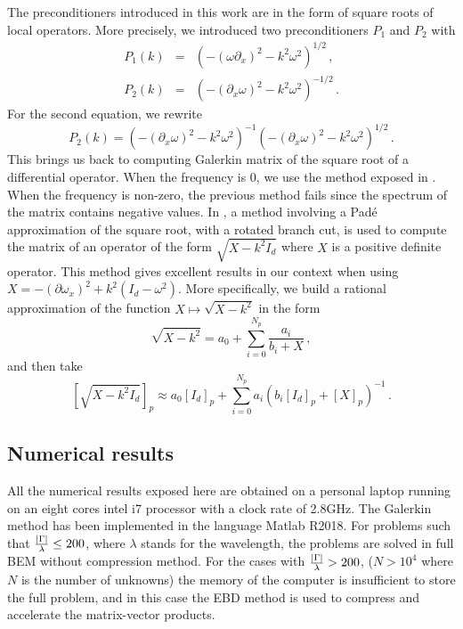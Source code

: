 \documentclass[a4paper]{article}
\begin{document}
The preconditioners introduced in this work are in the form of square roots of local operators. More precisely, we introduced two preconditioners $P_1$ and $P_2$ with 
\begin{eqnarray*}
	P_1(k) &=& \left(-(\omega \partial_x)^2 - k^2 \omega^2\right)^{1/2}\,,\\
	P_2(k) &=& \left(-(\partial_x \omega)^2 - k^2 \omega^2 \right)^{-1/2}\,.
\end{eqnarray*}
For the second equation, we rewrite 
\[P_2(k) = \left(-(\partial_x \omega)^2 - k^2 \omega^2 \right)^{-1} \left(-(\partial_x \omega)^2 - k^2 \omega^2 \right)^{1/2}\,.\]
This brings us back to computing Galerkin matrix of the square root of a differential operator. When the frequency is $0$, we use the method exposed in \cite{hale2008computing}. 
When the frequency is non-zero, the previous method fails since the spectrum of the matrix contains negative values. In \cite{antoine2007generalized}, a 
method involving a Pad\'e approximation of the square root, with a rotated branch cut, is used to compute the matrix of an operator of the form 
$\sqrt{X - k^2 I_d}$ where $X$ is a positive definite operator. This method gives excellent results in our context when using 
$X = -(\partial \omega_x)^2 + k^2 \left(I_d - \omega^2\right)$. More specifically, we build a rational approximation of the function $X \mapsto \sqrt{X - k^2}$ in the form
\[\sqrt{X - k^2} = a_0 + \sum_{i = 0}^{N_p} \frac{a_i}{b_i + X}\,,\]
and then take
\[\left[\sqrt{X - k^2 I_d}\right]_p \approx a_0[I_d]_p + \sum_{i = 0}^{N_p} a_i\left(b_i[I_d]_p + [X]_p\right)^{-1}\,.\]

\subsection{Numerical results}
\label{sec:NumericalResutls}

All the numerical results exposed here are obtained on a personal laptop running on an eight cores intel i7 processor with a clock rate of 2.8GHz. 
The Galerkin method has been implemented in the language Matlab R2018. For problems such that $\frac{\left\lvert \Gamma \right\rvert}{\lambda} \leq 200$, where $\lambda$ stands for the wavelength, the problems are solved in full BEM without compression method. For the cases with $\frac{\left\lvert \Gamma \right\rvert}{\lambda} > 200$, ($N > 10^4$ where $N$ is the number of unknowns) the memory of the computer is insufficient to store the full problem, and in this case the EBD method \cite{averseng2017} is used to compress and accelerate the matrix-vector products. 
\end{document}
